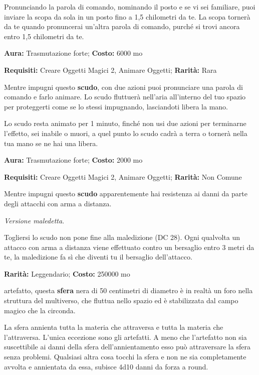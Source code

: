 \begin{multicols}{2}
Pronunciando la parola di comando, nominando il posto e se vi sei familiare, puoi inviare la scopa da sola in un posto fino a 1,5 chilometri da te. La scopa tornerà da te quando pronuncerai un'altra parola di comando, purché si trovi ancora entro 1,5 chilometri da te.


\textbf{Aura:} Trasmutazione forte; \textbf{Costo:} 6000 mo

\textbf{Requisiti:} Creare Oggetti Magici 2, Animare Oggetti; \textbf{Rarità:} Rara

Mentre impugni questo \textbf{scudo}, con due azioni puoi pronunciare una parola di comando e farlo animare. Lo scudo fluttuerà nell'aria all'interno del tuo spazio per proteggerti come se lo stessi impugnando, lasciandoti libera la mano.

Lo scudo resta animato per 1 minuto, finché non usi due azioni per terminarne l'effetto, sei inabile o muori, a quel punto lo scudo cadrà a terra o tornerà nella tua mano se ne hai una libera.


\textbf{Aura:} Trasmutazione forte; \textbf{Costo:} 2000 mo

\textbf{Requisiti:} Creare Oggetti Magici 2, Animare Oggetti; \textbf{Rarità:} Non Comune

Mentre impugni questo \textbf{scudo} apparentemente hai resistenza ai danni da parte degli attacchi con arma a distanza.

\emph{Versione maledetta}.

Togliersi lo scudo non pone fine alla maledizione (DC 28). Ogni qualvolta un attacco con arma a distanza viene effettuato contro un bersaglio entro 3 metri da te, la maledizione fa sì che diventi tu il bersaglio dell'attacco.


\textbf{Rarità:} Leggendario; \textbf{Costo:} 250000 mo

artefatto, questa \textbf{sfera} nera di 50 centimetri di diametro è in realtà un foro nella struttura del multiverso, che fluttua nello spazio ed è stabilizzata dal campo magico che la circonda.

La sfera annienta tutta la materia che attraversa e tutta la materia che l'attraversa. L'unica eccezione sono gli artefatti. A meno che l'artefatto non sia suscettibile ai danni della sfera dell'annientamento esso può attraversare la sfera senza problemi. Qualsiasi altra cosa tocchi la sfera e non ne sia completamente avvolta e annientata da essa, subisce 4d10 danni da forza a round.


\end{multicols}
